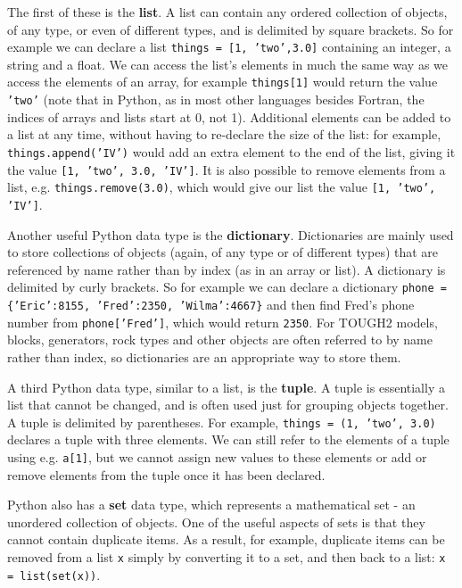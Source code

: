 The first of these is the \textbf{list}.  A list can contain any ordered collection of objects, of any type, or even of different types, and is delimited by square brackets.  So for example we can declare a list \texttt{things = [1, 'two',3.0]} containing an integer, a string and a float.  We can access the list's elements in much the same way as we access the elements of an array, for example \texttt{things[1]} would return the value \texttt{'two'} (note that in Python, as in most other languages besides Fortran, the indices of arrays and lists start at 0, not 1).  Additional elements can be added to a list at any time, without having to re-declare the size of the list: for example, \texttt{things.append('IV')} would add an extra element to the end of the list, giving it the value \texttt{[1, 'two', 3.0, 'IV']}.  It is also possible to remove elements from a list, e.g. \texttt{things.remove(3.0)}, which would give our list the value \texttt{[1, 'two', 'IV']}.

Another useful Python data type is the \textbf{dictionary}.  Dictionaries are mainly used to store collections of objects (again, of any type or of different types) that are referenced by name rather than by index (as in an array or list).  A dictionary is delimited by curly brackets.  So for example we can declare a dictionary \texttt{phone = \{'Eric':8155, 'Fred':2350, 'Wilma':4667\}} and then find Fred's phone number from \texttt{phone['Fred']}, which would return \texttt{2350}.  For TOUGH2 models, blocks, generators, rock types and other objects are often referred to by name rather than index, so dictionaries are an appropriate way to store them.

A third Python data type, similar to a list, is the \textbf{tuple}.  A tuple is essentially a list that cannot be changed, and is often used just for grouping objects together.  A tuple is delimited by parentheses.  For example, \texttt{things = (1, 'two', 3.0)} declares a tuple with three elements.  We can still refer to the elements of a tuple using e.g. \texttt{a[1]}, but we cannot assign new values to these elements or add or remove elements from the tuple once it has been declared.

Python also has a \textbf{set} data type, which represents a mathematical set - an unordered collection of objects.  One of the useful aspects of sets is that they cannot contain duplicate items.  As a result, for example, duplicate items can be removed from a list \texttt{x} simply by converting it to a set, and then back to a list: \texttt{x = list(set(x))}.

